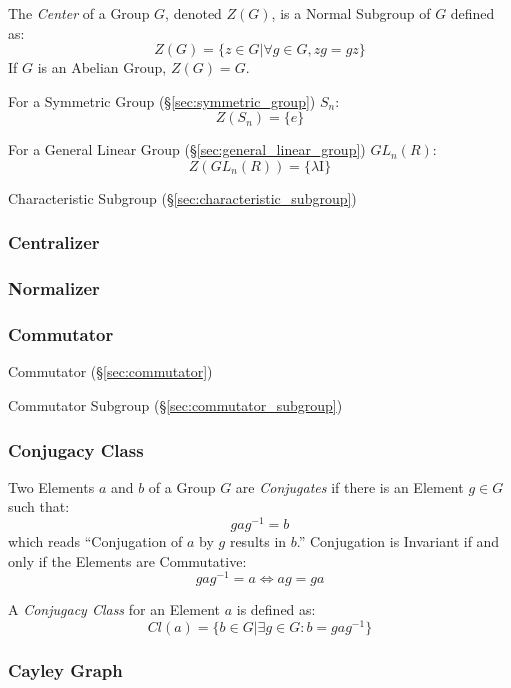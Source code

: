 The \emph{Center} of a Group $G$, denoted $Z(G)$, is a Normal Subgroup
of $G$ defined as:
\[
    Z(G) = \{ z \in G | \forall g \in G, zg = gz \}
\]
If $G$ is an Abelian Group, $Z(G) = G$.

For a Symmetric Group (\S\ref{sec:symmetric_group}) $S_n$:
\[
    Z(S_n) = \{e\}
\]

For a General Linear Group (\S\ref{sec:general_linear_group})
$GL_n(R)$:
\[
    Z(GL_n(R)) = \{\lambda \mathrm{I}\}
\]

Characteristic Subgroup (\S\ref{sec:characteristic_subgroup})



\subsubsection{Centralizer}\label{sec:group_centralizer}

\subsubsection{Normalizer}\label{sec:group_normalizer}

\subsubsection{Commutator}\label{sec:group_commutator}

Commutator (\S\ref{sec:commutator})

Commutator Subgroup (\S\ref{sec:commutator_subgroup})



\subsubsection{Conjugacy Class}\label{sec:conjugacy_class}

Two Elements $a$ and $b$ of a Group $G$ are \emph{Conjugates} if there
is an Element $g \in G$ such that:
\[
    gag^{-1} = b
\]
which reads ``Conjugation of $a$ by $g$ results in $b$.'' Conjugation
is Invariant if and only if the Elements are Commutative:
\[
    gag^{-1} = a \Leftrightarrow ag = ga
\]

A \emph{Conjugacy Class} for an Element $a$ is defined as:
\[
    Cl(a) = \{ b \in G | \exists g \in G : b = gag^{-1}\}
\]



\subsubsection{Cayley Graph}\label{sec:cayley_graph}


